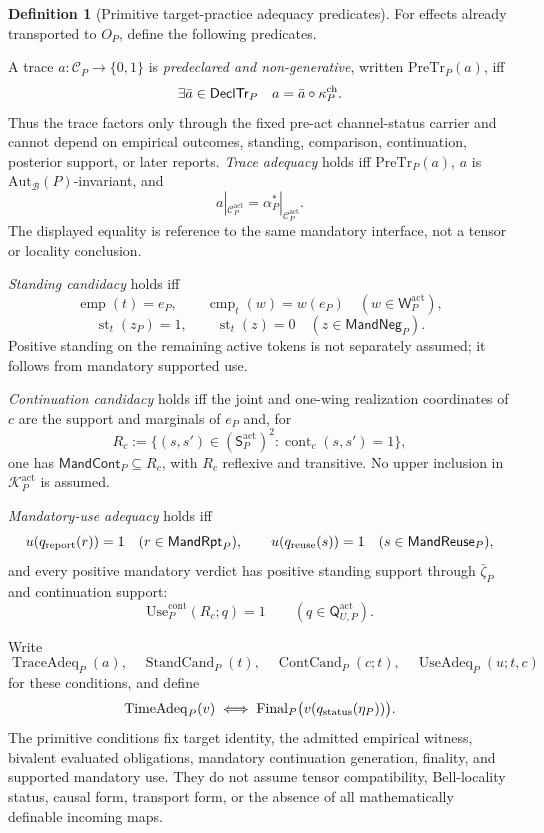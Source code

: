 \documentclass[11pt]{article}
\theoremstyle{definition}
\newtheorem{definition}[theorem]{Definition}
\newcommand{\Bell}{\mathcal{B}}
\newcommand{\AutBell}{\mathrm{Aut}_{\Bell}(P)}
\newcommand{\Active}{\mathrm{act}}
\newcommand{\MandRpt}{\mathsf{MandRpt}}
\newcommand{\MandReuse}{\mathsf{MandReuse}}
\newcommand{\MandCont}{\mathsf{MandCont}}
\newcommand{\MandNeg}{\mathsf{MandNeg}}
\newcommand{\FinalP}{\mathrm{Final}_{P}}
\newcommand{\PreTrace}{\mathrm{PreTr}_{P}}
\newcommand{\ContUse}{\mathrm{Use}^{\mathrm{cont}}_{P}}
\begin{document}
\begin{definition}[Primitive target-practice adequacy predicates]\label{def:primitiveadequacypredicates}
For effects already transported to $O_P$, define the following predicates.

A trace $a:\mathcal C_P\to\{0,1\}$ is \emph{predeclared and non-generative}, written $\PreTrace(a)$, iff
\[
\exists\bar a\in\mathsf{DeclTr}_P\quad a=\bar a\circ\kappa_P^{\rm ch}.
\]
Thus the trace factors only through the fixed pre-act channel-status carrier and cannot depend on empirical outcomes, standing, comparison, continuation, posterior support, or later reports. \emph{Trace adequacy} holds iff $\PreTrace(a)$, $a$ is $\AutBell$-invariant, and
\[
a|_{\mathcal C_P^{\Active}}
=\alpha_P^*|_{\mathcal C_P^{\Active}}.
\]
The displayed equality is reference to the same mandatory interface, not a tensor or locality conclusion.

\emph{Standing candidacy} holds iff
\[
\operatorname{emp}(t)=e_P,
\qquad
\operatorname{cmp}_t(w)=w(e_P)\quad(w\in\mathsf W_P^{\Active}),
\]
\[
\operatorname{st}_t(z_P)=1,
\qquad
\operatorname{st}_t(z)=0\quad(z\in\MandNeg_P).
\]
Positive standing on the remaining active tokens is not separately assumed; it follows from mandatory supported use.

\emph{Continuation candidacy} holds iff the joint and one-wing realization coordinates of $c$ are the support and marginals of $e_P$ and, for
\[
R_c:=\{(s,s')\in(\mathsf S_P^{\Active})^2:
\operatorname{cont}_c(s,s')=1\},
\]
one has $\MandCont_P\subseteq R_c$, with $R_c$ reflexive and transitive. No upper inclusion in $\mathcal K_P^{\Active}$ is assumed.

\emph{Mandatory-use adequacy} holds iff
\[
u(q_{\rm report}(r))=1\quad(r\in\MandRpt_P),
\qquad
u(q_{\rm reuse}(s))=1\quad(s\in\MandReuse_P),
\]
and every positive mandatory verdict has positive standing support through $\bar\zeta_P$ and continuation support:
\[
\ContUse(R_c;q)=1
\qquad(q\in\mathsf Q_{U,P}^{\Active}).
\]

Write
\[
\operatorname{TraceAdeq}_P(a),\quad
\operatorname{StandCand}_P(t),\quad
\operatorname{ContCand}_P(c;t),\quad
\operatorname{UseAdeq}_P(u;t,c)
\]
for these conditions, and define
\[
\operatorname{TimeAdeq}_P(v)
\iff
\FinalP\bigl(v(q_{\rm status}(\eta_P))\bigr).
\]
The primitive conditions fix target identity, the admitted empirical witness, bivalent evaluated obligations, mandatory continuation generation, finality, and supported mandatory use. They do not assume tensor compatibility, Bell-locality status, causal form, transport form, or the absence of all mathematically definable incoming maps.
\end{definition}
\end{document}
